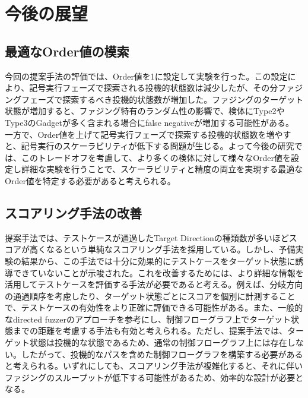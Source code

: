 \section{今後の展望}

\subsection{最適なOrder値の模索}
今回の提案手法の評価では、Order値を1に設定して実験を行った。この設定により、記号実行フェーズで探索される投機的状態数は減少したが、その分ファジングフェーズで探索するべき投機的状態数が増加した。ファジングのターゲット状態が増加すると、ファジング特有のランダム性の影響で、検体にType2やType3のGadgetが多く含まれる場合にfalse negativeが増加する可能性がある。
一方で、Order値を上げて記号実行フェーズで探索する投機的状態数を増やすと、記号実行のスケーラビリティが低下する問題が生じる。よって今後の研究では、このトレードオフを考慮して、より多くの検体に対して様々なOrder値を設定し詳細な実験を行うことで、スケーラビリティと精度の両立を実現する最適なOrder値を特定する必要があると考えられる。\par

\subsection{スコアリング手法の改善}
提案手法では、テストケースが通過したTarget Directionの種類数が多いほどスコアが高くなるという単純なスコアリング手法を採用している。しかし、予備実験の結果から、この手法では十分に効果的にテストケースをターゲット状態に誘導できていないことが示唆された。これを改善するためには、より詳細な情報を活用してテストケースを評価する手法が必要であると考える。例えば、分岐方向の通過順序を考慮したり、ターゲット状態ごとにスコアを個別に計測することで、テストケースの有効性をより正確に評価できる可能性がある。また、一般的なdirected fuzzer\cite{bohme2017directed}のアプローチを参考にし、制御フローグラフ上でターゲット状態までの距離を考慮する手法も有効と考えられる。ただし、提案手法では、ターゲット状態は投機的な状態であるため、通常の制御フローグラフ上には存在しない。したがって、投機的なパスを含めた制御フローグラフを構築する必要があると考えられる。いずれにしても、スコアリング手法が複雑化すると、それに伴いファジングのスループットが低下する可能性があるため、効率的な設計が必要となる。

